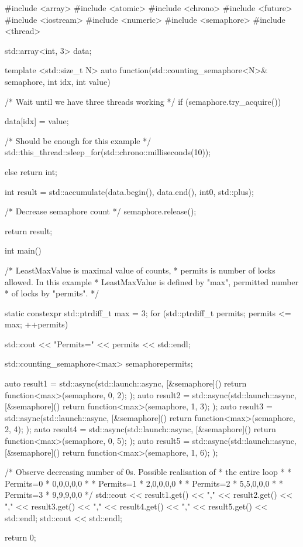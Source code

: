 \documentclass[../main]{subfiles}
\begin{document}
\begin{Code}
    #include <array>
    #include <atomic>
    #include <chrono>
    #include <future>
    #include <iostream>
    #include <numeric>
    #include <semaphore>
    #include <thread>

    std::array<int, 3> data{};

    template <std::size_t N>
    auto function(std::counting_semaphore<N>& semaphore, int idx, int value)
    {
        /* Wait until we have three threads working */
        if (semaphore.try_acquire())
        {
            data[idx] = value;

            /* Should be enough for this example */
            std::this_thread::sleep_for(std::chrono::milliseconds(10));
        }
        else
        {
            return int{};
        }

        int result = std::accumulate(data.begin(), data.end(),
            int{0}, std::plus{});

        /* Decrease semaphore count */
        semaphore.release();

        return result;
    }

    int main()
    {
        /* LeastMaxValue is maximal value of counts,
         * permits is number of locks allowed. In this example
         * LeastMaxValue is defined by "max", permitted number
         * of locks by "permits".
         */

        static constexpr std::ptrdiff_t max = 3;
        for (std::ptrdiff_t permits{}; permits <= max; ++permits)
        {
            std::cout << "Permits=" << permits << std::endl;

            std::counting_semaphore<max> semaphore{permits};

            auto result1 = std::async(std::launch::async,
                [&semaphore]() { return function<max>(semaphore, 0, 2); });
            auto result2 = std::async(std::launch::async,
                [&semaphore]() { return function<max>(semaphore, 1, 3); });
            auto result3 = std::async(std::launch::async,
                [&semaphore]() { return function<max>(semaphore, 2, 4); });
            auto result4 = std::async(std::launch::async,
                [&semaphore]() { return function<max>(semaphore, 0, 5); });
            auto result5 = std::async(std::launch::async,
                [&semaphore]() { return function<max>(semaphore, 1, 6); });

            /* Observe decreasing number of 0s. Possible realisation of
             * the entire loop
             *
             * Permits=0
             * 0,0,0,0,0
             *
             * Permits=1
             * 2,0,0,0,0
             *
             * Permits=2
             * 5,5,0,0,0
             *
             * Permits=3
             * 9,9,9,0,0
             */
            std::cout << result1.get() << ","
                      << result2.get() << ","
                      << result3.get() << ","
                      << result4.get() << ","
                      << result5.get() << std::endl;
            std::cout << std::endl;
        }

        return 0;
    }
\end{Code}
\end{document}
